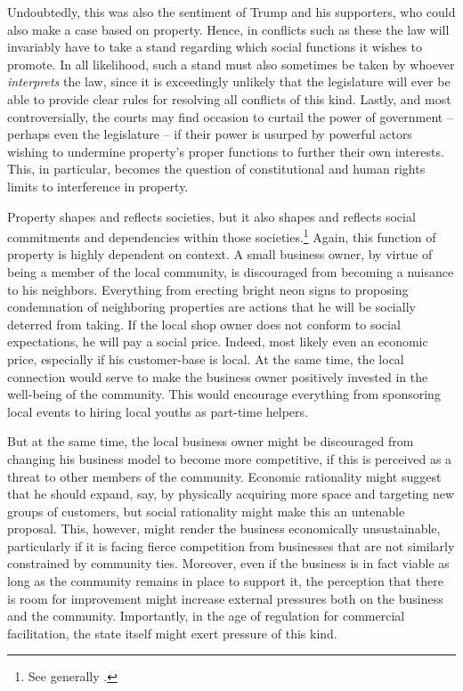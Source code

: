 \documentclass[12pt,a4paper]{book} %
\begin{document}
Undoubtedly, this was also the sentiment of Trump and his supporters, who could also make a case based on property. Hence, in conflicts such as these the law will invariably have to take a stand regarding which social functions it wishes to promote. In all likelihood, such a stand must also sometimes be taken by whoever {\it interprets} the law, since it is exceedingly unlikely that the legislature will ever be able to provide clear rules for resolving all conflicts of this kind. Lastly, and most controversially, the courts may find occasion to curtail the power of government -- perhaps even the legislature -- if their power is usurped by powerful actors wishing to undermine property's proper functions to further their own interests. This, in particular, becomes the question of constitutional and human rights limits to interference in property.

Property shapes and reflects societies, but it also shapes and reflects social commitments and dependencies within those societies.\footnote{See generally \cite{alexander09}.} Again, this function of property is highly dependent on context. A small business owner, by virtue of being a member of the local community, is discouraged from becoming a nuisance to his neighbors. Everything from erecting bright neon signs to proposing condemnation of neighboring properties are actions that he will be socially deterred from taking. If the local shop owner does not conform to social expectations, he will pay a social price. Indeed, most likely even an economic price, especially if his customer-base is local. At the same time, the local connection would serve to make the business owner positively invested in the well-being of the community. This would encourage everything from sponsoring local events to hiring local youths as part-time helpers.

But at the same time, the local business owner might be discouraged from changing his business model to become more competitive, if this is perceived as a threat to other members of the community. Economic rationality might suggest that he should expand, say, by physically acquiring more space and targeting new groups of customers, but social rationality might make this an untenable proposal. This, however, might render the business economically unsustainable, particularly if it is facing fierce competition from businesses that are not similarly constrained by community ties. Moreover, even if the business is in fact viable as long as the community remains in place to support it, the perception that there is room for improvement might increase external pressures both on the business and the community. Importantly, in the age of regulation for commercial facilitation, the state itself might exert pressure of this kind.
\end{document}

